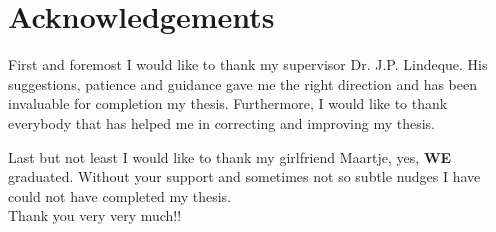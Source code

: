 \chapter*{Acknowledgements}

First and foremost I would like to thank my supervisor Dr. J.P. Lindeque. 
His suggestions, patience and guidance gave me the right direction and has been invaluable for completion my thesis. 
Furthermore, I would like to thank everybody that has helped me in correcting and improving my thesis.

Last but not least I would like to thank my girlfriend Maartje, yes, \textbf{WE} graduated.
Without your support and sometimes not so subtle nudges I have could not have completed my thesis.\\
Thank you very very much!!